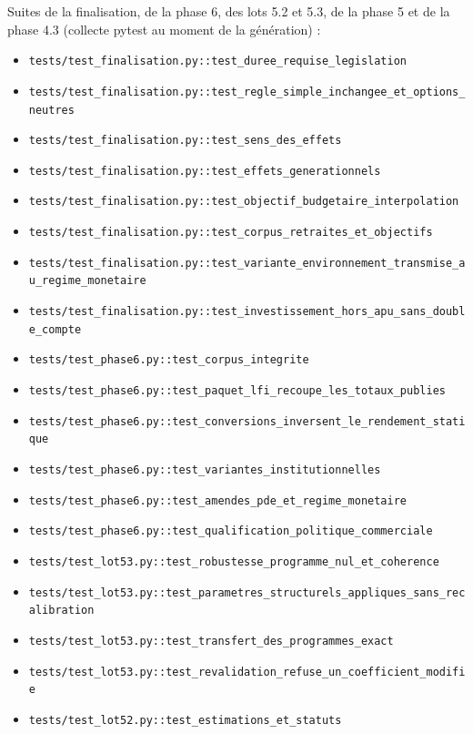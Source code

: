 \documentclass[
  11pt,
  11pt,
  a4paper,
  openany]{book}
\providecommand{\tightlist}{%
  \setlength{\itemsep}{0pt}\setlength{\parskip}{0pt}}
\begin{document}
Suites de la finalisation, de la phase 6, des lots 5.2 et 5.3, de la
phase 5 et de la phase 4.3 (collecte pytest au moment de la génération)
:

\begin{itemize}
\tightlist
\item
  \texttt{tests/test\_finalisation.py::test\_duree\_requise\_legislation}
\item
  \texttt{tests/test\_finalisation.py::test\_regle\_simple\_inchangee\_et\_options\_neutres}
\item
  \texttt{tests/test\_finalisation.py::test\_sens\_des\_effets}
\item
  \texttt{tests/test\_finalisation.py::test\_effets\_generationnels}
\item
  \texttt{tests/test\_finalisation.py::test\_objectif\_budgetaire\_interpolation}
\item
  \texttt{tests/test\_finalisation.py::test\_corpus\_retraites\_et\_objectifs}
\item
  \texttt{tests/test\_finalisation.py::test\_variante\_environnement\_transmise\_au\_regime\_monetaire}
\item
  \texttt{tests/test\_finalisation.py::test\_investissement\_hors\_apu\_sans\_double\_compte}
\item
  \texttt{tests/test\_phase6.py::test\_corpus\_integrite}
\item
  \texttt{tests/test\_phase6.py::test\_paquet\_lfi\_recoupe\_les\_totaux\_publies}
\item
  \texttt{tests/test\_phase6.py::test\_conversions\_inversent\_le\_rendement\_statique}
\item
  \texttt{tests/test\_phase6.py::test\_variantes\_institutionnelles}
\item
  \texttt{tests/test\_phase6.py::test\_amendes\_pde\_et\_regime\_monetaire}
\item
  \texttt{tests/test\_phase6.py::test\_qualification\_politique\_commerciale}
\item
  \texttt{tests/test\_lot53.py::test\_robustesse\_programme\_nul\_et\_coherence}
\item
  \texttt{tests/test\_lot53.py::test\_parametres\_structurels\_appliques\_sans\_recalibration}
\item
  \texttt{tests/test\_lot53.py::test\_transfert\_des\_programmes\_exact}
\item
  \texttt{tests/test\_lot53.py::test\_revalidation\_refuse\_un\_coefficient\_modifie}
\item
  \texttt{tests/test\_lot52.py::test\_estimations\_et\_statuts}

\end{itemize}
\end{document}
